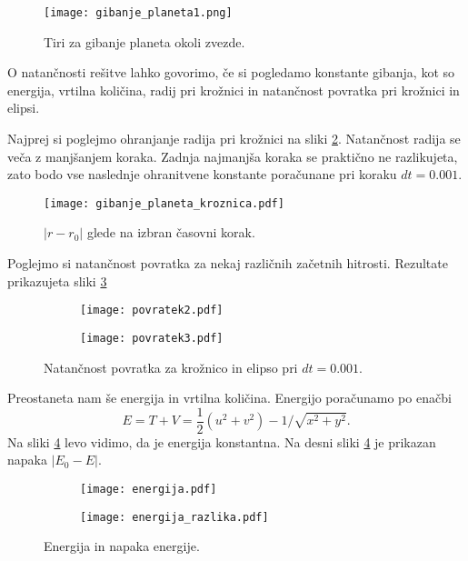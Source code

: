 \documentclass[12pt,a4paper]{article}
\begin{document}
\begin{figure}[H]
    \centering
        \texttt{[image: gibanje\_planeta1.png]}
    \caption{Tiri za gibanje planeta okoli zvezde.} \label{fig:slika2}
\end{figure}

O natančnosti rešitve lahko govorimo, če si pogledamo konstante gibanja, kot so energija, vrtilna količina, radij pri krožnici in natančnost povratka pri krožnici in elipsi.

Najprej si poglejmo ohranjanje radija pri krožnici na sliki \ref{fig:slika3}. Natančnost radija se veča z manjšanjem koraka. Zadnja najmanjša koraka se praktično ne razlikujeta, zato bodo vse naslednje ohranitvene konstante poračunane pri koraku $dt=0.001$.
\begin{figure}[H]
    \centering
        \texttt{[image: gibanje\_planeta\_kroznica.pdf]}
    \caption{$|r-r_0|$ glede na izbran časovni korak.} \label{fig:slika3}
\end{figure}
\noindent Poglejmo si natančnost povratka za nekaj različnih začetnih hitrosti. Rezultate prikazujeta sliki \ref{fig:slika4}

\begin{figure}[H]
    \centering
    \begin{subfigure}[b]{0.45\textwidth}  			
        \texttt{[image: povratek2.pdf]}
    \end{subfigure}
    \begin{subfigure}[b]{0.45\textwidth}  			
        \texttt{[image: povratek3.pdf]}
    \end{subfigure}
    \caption{Natančnost povratka za krožnico in elipso pri $dt=0.001$.} \label{fig:slika4}
\end{figure}

\noindent Preostaneta nam še energija in vrtilna količina. Energijo poračunamo po enačbi
\begin{equation} \label{eq:enacba8}
E=T+V= \frac{1}{2} (u^{2} + v^{2}) - 1/ \sqrt{x^{2} +y^{2}}.
\end{equation}
Na sliki \ref{fig:slika5} levo vidimo, da je energija konstantna. Na desni sliki \ref{fig:slika5} je prikazan napaka $|E_0 -E|$.

\begin{figure}[H]
    \centering
    \begin{subfigure}[b]{0.45\textwidth}  			
        \texttt{[image: energija.pdf]}
    \end{subfigure}
    \begin{subfigure}[b]{0.45\textwidth}  			
        \texttt{[image: energija\_razlika.pdf]}
    \end{subfigure}
    \caption{Energija in napaka energije.} \label{fig:slika5}
\end{figure}
\end{document}
